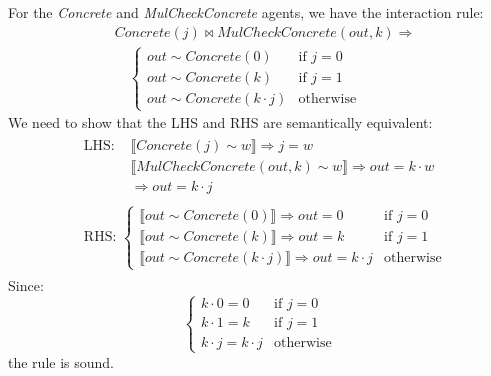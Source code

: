 \begin{lemma}
	For the \textit{Concrete} and \textit{MulCheckConcrete} agents, we have the interaction rule:
	$$
	\begin{aligned}
		& \mathit{Concrete}(j) \bowtie \mathit{MulCheckConcrete}(\mathit{out}, k) \Rightarrow \\
		& \quad \begin{cases}
			\mathit{out} \sim \mathit{Concrete}(0) & \text{if } j = 0 \\
			\mathit{out} \sim \mathit{Concrete}(k) & \text{if } j = 1 \\
			\mathit{out} \sim \mathit{Concrete}(k \cdot j) & \text{otherwise}
		\end{cases}
	\end{aligned}
	$$
	We need to show that the LHS and RHS are semantically equivalent:
	$$
	\begin{aligned}
		& \begin{aligned}
			\text{LHS: } & \llbracket \mathit{Concrete}(j) \sim w \rrbracket \Rightarrow j = w \\
			& \llbracket \mathit{MulCheckConcrete}(\mathit{out}, k) \sim w \rrbracket \Rightarrow \mathit{out} = k \cdot w \\
			& \Rightarrow \mathit{out} = k \cdot j
		\end{aligned} \\
		& \begin{aligned}
			\text{RHS: }
			\begin{cases}
				\llbracket \mathit{out} \sim \mathit{Concrete}(0) \rrbracket \Rightarrow \mathit{out} = 0 & \text{if } j = 0 \\
				\llbracket \mathit{out} \sim \mathit{Concrete}(k) \rrbracket \Rightarrow \mathit{out} = k & \text{if } j = 1 \\
				\llbracket \mathit{out} \sim \mathit{Concrete}(k \cdot j) \rrbracket \Rightarrow \mathit{out} = k \cdot j & \text{otherwise}
			\end{cases}
		\end{aligned}
	\end{aligned}
	$$
	Since:
	$$
	\begin{cases}
		k \cdot 0 = 0 & \text{if } j = 0 \\
		k \cdot 1 = k & \text{if } j = 1 \\
		k \cdot j = k \cdot j & \text{otherwise}
	\end{cases}
	$$
	the rule is sound.
\end{lemma}

